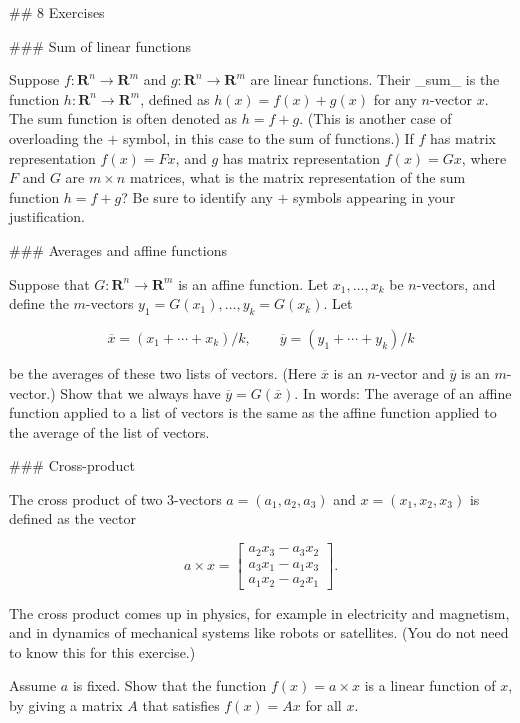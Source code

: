 

## 8 Exercises

### Sum of linear functions

Suppose \(f:\mathbf{R}^{n}\to\mathbf{R}^{m}\) and \(g:\mathbf{R}^{n}\to\mathbf{R}^{m}\) are linear functions. Their _sum_ is the function \(h:\mathbf{R}^{n}\to\mathbf{R}^{m}\), defined as \(h(x)=f(x)+g(x)\) for any \(n\)-vector \(x\). The sum function is often denoted as \(h=f+g\). (This is another case of overloading the \(+\) symbol, in this case to the sum of functions.) If \(f\) has matrix representation \(f(x)=Fx\), and \(g\) has matrix representation \(f(x)=Gx\), where \(F\) and \(G\) are \(m\times n\) matrices, what is the matrix representation of the sum function \(h=f+g\)? Be sure to identify any \(+\) symbols appearing in your justification.

### Averages and affine functions

Suppose that \(G:\mathbf{R}^{n}\to\mathbf{R}^{m}\) is an affine function. Let \(x_{1},\ldots,x_{k}\) be \(n\)-vectors, and define the \(m\)-vectors \(y_{1}=G(x_{1}),\ldots,y_{k}=G(x_{k})\). Let

\[\overline{x}=(x_{1}+\cdots+x_{k})/k,\qquad\overline{y}=(y_{1}+\cdots+y_{k})/k\]

be the averages of these two lists of vectors. (Here \(\overline{x}\) is an \(n\)-vector and \(\overline{y}\) is an \(m\)-vector.) Show that we always have \(\overline{y}=G(\overline{x})\). In words: The average of an affine function applied to a list of vectors is the same as the affine function applied to the average of the list of vectors.

### Cross-product

The cross product of two 3-vectors \(a=(a_{1},a_{2},a_{3})\) and \(x=(x_{1},x_{2},x_{3})\) is defined as the vector

\[a\times x=\left[\begin{array}{c}a_{2}x_{3}-a_{3}x_{2}\\ a_{3}x_{1}-a_{1}x_{3}\\ a_{1}x_{2}-a_{2}x_{1}\end{array}\right].\]

The cross product comes up in physics, for example in electricity and magnetism, and in dynamics of mechanical systems like robots or satellites. (You do not need to know this for this exercise.)

Assume \(a\) is fixed. Show that the function \(f(x)=a\times x\) is a linear function of \(x\), by giving a matrix \(A\) that satisfies \(f(x)=Ax\) for all \(x\).

